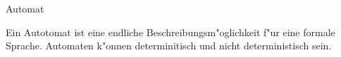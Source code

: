 \documentclass[class=article, crop=false]{standalone}
\begin{document}
\begin{zettel}{Automat}
\begin{flashcard}[]{}
	\begin{definition}
		Ein Autotomat ist eine endliche Beschreibungsm"oglichkeit f"ur eine formale Sprache.
		Automaten k"onnen determinitisch und nicht deterministisch sein.
	\end{definition}
\end{flashcard}
\end{zettel}
\end{document}
